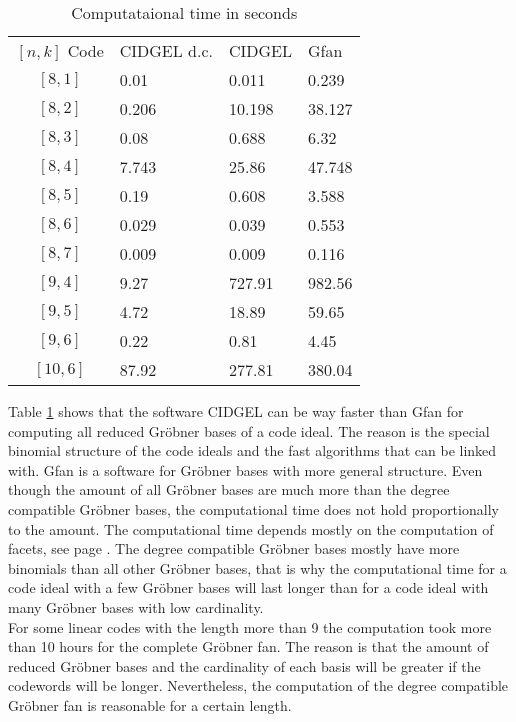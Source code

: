  \begin{table}[htpb] 
 \centering 
 \caption{Computataional time in seconds}
 \begin{tabular}{c|l|l|l} %
   $[n,k]$ Code & CIDGEL d.c. & CIDGEL & Gfan \\
 \cline{1-4} $[8,1]$  & 0.01  & 0.011  & 0.239 \\
 			 $[8,2]$  & 0.206 & 10.198 & 38.127 \\
  			 $[8,3]$  & 0.08  & 0.688  & 6.32 \\
  			 $[8,4]$  & 7.743 & 25.86  & 47.748 \\
 			 $[8,5]$  & 0.19  & 0.608  & 3.588  \\
 			 $[8,6]$  & 0.029 & 0.039  & 0.553\\
  			 $[8,7]$  & 0.009 & 0.009  & 0.116 \\
  			 $[9,4]$  & 9.27  & 727.91 & 982.56 \\
  			 $[9,5]$  & 4.72  & 18.89  & 59.65 \\
  			 $[9,6]$  & 0.22  & 0.81   & 4.45 \\
  			 $[10,6]$ & 87.92 & 277.81 & 380.04 \\
 \end{tabular}
 \label{tab:benchmark}
 \end{table}  
 
 \newpage
 
 Table \ref{tab:benchmark} shows that the software CIDGEL can be way faster than Gfan for computing all reduced Gröbner bases of a code ideal. The reason is the special binomial structure of the code ideals and the fast algorithms that can be linked with. Gfan is a software for Gröbner bases with more general structure.
 Even though the amount of all Gröbner bases are much more than the degree compatible Gröbner bases, the computational time does not hold proportionally to the amount.
 The computational time depends mostly on the computation of facets, see page \pageref{facets}. The degree compatible Gröbner bases mostly have more binomials than all other Gröbner bases, that is why the computational time for a code ideal with a few Gröbner bases will last longer than for a code ideal with many Gröbner bases with low cardinality. \\
 
 For some linear codes with the length more than 9 the computation took more than 10 hours for the complete Gröbner fan. The reason is that the amount of reduced Gröbner bases and the cardinality of each basis will be greater if the codewords will be longer. Nevertheless, the computation of the degree compatible Gröbner fan is reasonable for a certain length.\newpage
 
